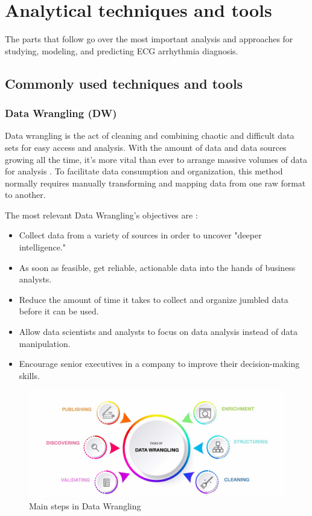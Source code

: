 \chapter{Analytical techniques and tools} \label{chap4}

The parts that follow go over the most important analysis and approaches for studying, modeling, and predicting ECG arrhythmia diagnosis.

\section{Commonly used techniques and tools} \label{4commontools}

\subsection{Data Wrangling (DW)} \label{4dw}

Data wrangling is the act of cleaning and combining chaotic and difficult data sets for easy access and analysis. With the amount of data and data sources growing all the time, it's more vital than ever to arrange massive volumes of data for analysis \cite{datawrang}. To facilitate data consumption and organization, this method normally requires manually transforming and mapping data from one raw format to another.

The most relevant Data Wrangling's objectives are \cite{datawrang}:

\begin{itemize}
    \item Collect data from a variety of sources in order to uncover "deeper intelligence."
    \item As soon as feasible, get reliable, actionable data into the hands of business analysts.
    \item Reduce the amount of time it takes to collect and organize jumbled data before it can be used.
    \item Allow data scientists and analysts to focus on data analysis instead of data manipulation.
    \item Encourage senior executives in a company to improve their decision-making skills.
\end{itemize}

\begin{figure}[H]
\centering
\includegraphics[scale=0.18]{img/DATA_WRANGLING.jpg}
\caption{Main steps in Data Wrangling}
\label{fig:dwprocess}
\end{figure}

